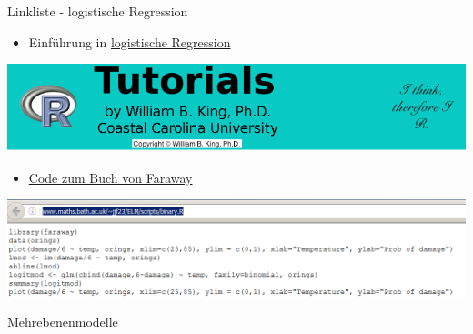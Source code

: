 \documentclass[ignorenonframetext,]{beamer}
\providecommand{\tightlist}{%
\setlength{\itemsep}{0pt}\setlength{\parskip}{0pt}}
\begin{document}
\begin{frame}{Linkliste - logistische Regression}

\begin{itemize}
\tightlist
\item
  Einführung in
  \href{http://ww2.coastal.edu/kingw/statistics/R-tutorials/logistic.html}{logistische
  Regression}
\end{itemize}

\includegraphics{./tex2pdf.956/93185dd4bb7c1484371fe0dff58cdcc515faed5f.png}

\begin{itemize}
\tightlist
\item
  \href{http://www.maths.bath.ac.uk/~jjf23/ELM/scripts/binary.R}{Code
  zum Buch von Faraway}
\end{itemize}

\includegraphics{./tex2pdf.956/0c0890de6fb1b81cbe3195b34d2f26de4789abc9.png}

\end{frame}

\begin{frame}{Mehrebenenmodelle}

\end{frame}
\end{document}
